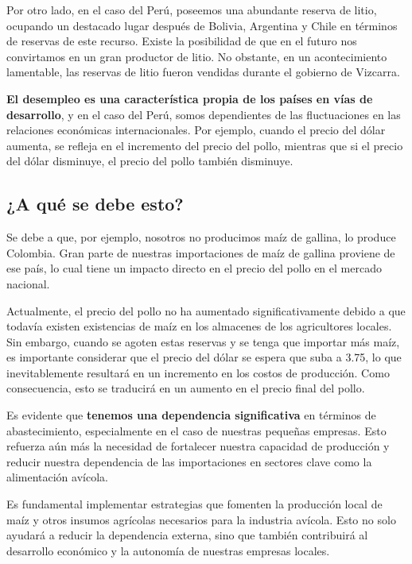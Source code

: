 \documentclass[
  letterpaper,
  DIV=11,
  numbers=noendperiod]{scrartcl}
\begin{document}
Por otro lado, en el caso del Perú, poseemos una abundante reserva de
litio, ocupando un destacado lugar después de Bolivia, Argentina y Chile
en términos de reservas de este recurso. Existe la posibilidad de que en
el futuro nos convirtamos en un gran productor de litio. No obstante, en
un acontecimiento lamentable, las reservas de litio fueron vendidas
durante el gobierno de Vizcarra.

\textbf{El desempleo es una característica propia de los países en vías
de desarrollo}, y en el caso del Perú, somos dependientes de las
fluctuaciones en las relaciones económicas internacionales. Por ejemplo,
cuando el precio del dólar aumenta, se refleja en el incremento del
precio del pollo, mientras que si el precio del dólar disminuye, el
precio del pollo también disminuye.

\hypertarget{a-quuxe9-se-debe-esto}{%
\subsection{¿A qué se debe esto?}\label{a-quuxe9-se-debe-esto}}

Se debe a que, por ejemplo, nosotros no producimos maíz de gallina, lo
produce Colombia. Gran parte de nuestras importaciones de maíz de
gallina proviene de ese país, lo cual tiene un impacto directo en el
precio del pollo en el mercado nacional.

Actualmente, el precio del pollo no ha aumentado significativamente
debido a que todavía existen existencias de maíz en los almacenes de los
agricultores locales. Sin embargo, cuando se agoten estas reservas y se
tenga que importar más maíz, es importante considerar que el precio del
dólar se espera que suba a 3.75, lo que inevitablemente resultará en un
incremento en los costos de producción. Como consecuencia, esto se
traducirá en un aumento en el precio final del pollo.

Es evidente que \textbf{tenemos una dependencia significativa} en
términos de abastecimiento, especialmente en el caso de nuestras
pequeñas empresas. Esto refuerza aún más la necesidad de fortalecer
nuestra capacidad de producción y reducir nuestra dependencia de las
importaciones en sectores clave como la alimentación avícola.

Es fundamental implementar estrategias que fomenten la producción local
de maíz y otros insumos agrícolas necesarios para la industria avícola.
Esto no solo ayudará a reducir la dependencia externa, sino que también
contribuirá al desarrollo económico y la autonomía de nuestras empresas
locales.
\end{document}
